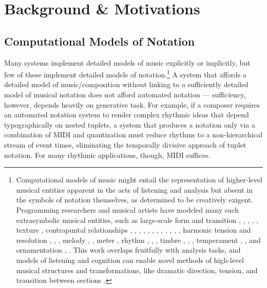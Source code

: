 \section{Background \& Motivations}\label{sec:background}

\subsection{Computational Models of Notation}

Many systems implement detailed models of music explicitly or implicitly, but few of these implement detailed models of notation.\footnote{Computational models of music might entail the representation of higher-level musical entities apparent in the acts of listening and analysis but absent in the symbols of notation themselves, as determined to be creatively exigent. Programming researchers and musical artists have modeled many such extrasymbolic musical entities, such as large-scale form and transition \cite{polansky1991morphological}, \cite{uno1994temporal}, \cite{dobrian1995algorithmic}, \cite{abrams1999higher}, \cite{Yoo1983}, texture \cite{Horenstein:2004kx}, contrapuntal relationships \cite{Boenn:2009oq}, \cite{Acevedo2005}, \cite{Anders:2011kl}, \cite{Balser:1990tg}, \cite{Jones:2000hc}, \cite{uno1994temporal}, \cite{Bell:1995ij}, \cite{farbood2001analysis}, \cite{Cope:2002fv}, \cite{Laurson:2005dz}, \cite{Polansky:2011fu}, \cite{Ebcioglu:1980kl}, harmonic tension and resolution \cite{Melo2003}, \cite{Wiggins1999}, \cite{Foster:1995qa}, melody \cite{Hornel:1993mi}, \cite{Smith:1992pi}, meter \cite{Hamanaka:2005ff}, rhythm \cite{Nauert2007}, \cite{Degazio:1996lh}, \cite{Collins:2003bs}, timbre \cite{Xenakis:1991fu}, \cite{Creasey:1996ye}, \cite{Osaka2004}, temperament \cite{Seymour:2007qo}, \cite{Graf:2006il}, and ornamentation \cite{Ariza:2003zt}, \cite{Chico-Topfer:1998jl}. This work overlaps fruitfully with analysis tasks, and models of listening and cognition can enable novel methods of high-level musical structures and transformations, like dramatic direction, tension, and transition between sections \cite[108]{Collins2009}.} A system that affords a detailed model of music/composition without linking to a sufficiently detailed model of musical notation does not afford automated notation --- sufficiency, however, depends heavily on generative task. For example, if a composer requires an automated notation system to render complex rhythmic ideas that depend typographically on nested tuplets, a system that produces a notation only via a combination of MIDI and quantization must reduce rhythms to a non-hierarchical stream of event times, eliminating the temporally divisive approach of tuplet notation. For many rhythmic applications, though, MIDI suffices. 

